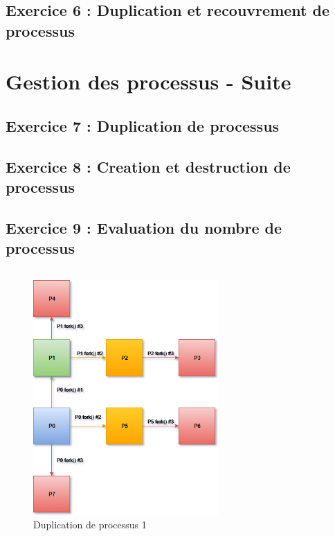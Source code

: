 \subsection{Exercice 6 : Duplication et recouvrement de processus}

\section{Gestion des processus - Suite}

\subsection{Exercice 7 : Duplication de processus}

\subsection{Exercice 8 : Creation et destruction de processus}

\subsection{Exercice 9 : Evaluation du nombre de processus}
\inputminted[linenos,firstline=5, lastline=9]{cpp}{../sources/cpp/TP5-6/ex9-programme1.c}
\begin{figure}[H]
\centering
\includegraphics[width=200pt]{./cpp/Pictures/tp5+tp6-ex9-programme1}
\caption{Duplication de processus 1}
\label{Duplication de processus 1}
\end{figure}

